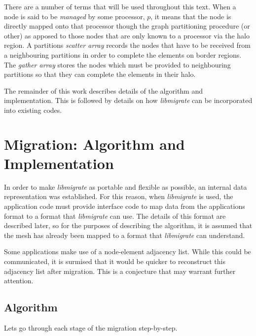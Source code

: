 \documentclass[11pt]{article}
\begin{document}
There are a number of terms that will be used throughout this
text. When a node is said to be {\it managed} by some processor, $p$,
it means that the node is directly mapped onto that processor though
the graph partitioning procedure (or other) as apposed to those nodes
that are only known to a processor via the halo region. A partitions
{\it scatter array} records the nodes that have to be received from a
neighbouring partitions in order to complete the elements on border
regions. The {\it gather array} stores the nodes which must be
provided to neighbouring partitions so that they can complete the
elements in their halo.

The remainder of this work describes details of the algorithm and
implementation. This is followed by details on how {\it libmigrate} can be
incorporated into existing codes.

\section{Migration: Algorithm and Implementation}
In order to make {\it libmigrate} as portable and flexible as
possible, an internal data representation was established. For this
reason, when {\it libmigrate} is used, the application code must
provide interface code to map data from the applications format to a
format that {\it libmigrate} can use. The details of this format are
described later, so for the purposes of describing the algorithm, it
is assumed that the mesh has already been mapped to a format that {\it
libmigrate} can understand.

Some applications make use of a node-element adjacency list. While
this could be communicated, it is surmised that it would be quicker to
reconstruct this adjacency list after migration. This is a conjecture
that may warrant further attention.

\subsection{Algorithm}
Lets go through each stage of the migration step-by-step.
\end{document}
